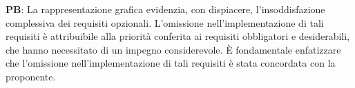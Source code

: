 \vspace{0.2cm}

\textbf{PB}: La rappresentazione grafica evidenzia, con dispiacere, l’insoddisfazione complessiva dei requisiti opzionali. L’omissione nell’implementazione di tali requisiti è attribuibile alla priorità conferita ai requisiti obbligatori e desiderabili, che hanno necessitato di un impegno considerevole. È fondamentale enfatizzare che l’omissione nell’implementazione di tali requisiti è stata concordata con la proponente.